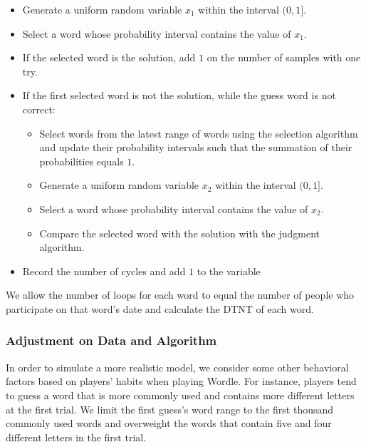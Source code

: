 \documentclass[12pt]{article}
\begin{document}
\begin{itemize}
    \item {Generate a uniform random variable $x_1$ within the interval $(0,1]$.}

    \item {Select a word whose probability interval contains the value of $x_1$.}

    \item {If the selected word is the solution, add $1$ on the number of samples with one try.}

    \item {If the first selected word is not the solution, while the guess word is not correct:}

    \begin{itemize}
        \item {Select words from the latest range of words using the selection algorithm and update their probability intervals such that the summation of their probabilities equals $1$.}

        \item {Generate a uniform random variable $x_2$ within the interval $(0,1]$.}

        \item {Select a word whose probability interval contains the value of $x_2$.}

        \item {Compare the selected word with the solution with the judgment algorithm.}
    \end{itemize}   

    \item {Record the number of cycles and add $1$ to the variable}
\end{itemize}

\vspace{0.3cm}
\noindent
We allow the number of loops for each word to equal the number of people who participate on that word’s date and calculate the DTNT of each word.

\subsubsection{Adjustment on Data and Algorithm}

In order to simulate a more realistic model, we consider some other behavioral factors based on players' habits when playing Wordle. For instance, players tend to guess a word that is more commonly used and contains more different letters at the first trial. We limit the first guess's word range to the first thousand commonly used words and overweight the words that contain five and four different letters in the first trial. 
\end{document}
